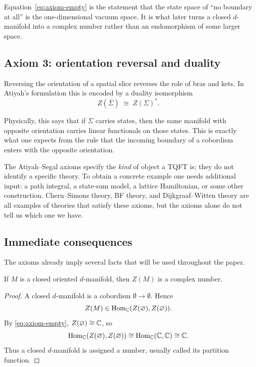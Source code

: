 \noindent Equation~\eqref{eq:axiom-empty} is the statement that the state space of ``no boundary at all'' is the one-dimensional vacuum space. It is what later turns a closed $d$-manifold into a complex number rather than an endomorphism of some larger space.

\subsection{Axiom 3: orientation reversal and duality}

Reversing the orientation of a spatial slice reverses the role of bras and kets. In Atiyah's formulation this is encoded by a duality isomorphism
\begin{equation}\label{eq:axiom-duality}
Z(\overline{\Sigma}) \;\cong\; Z(\Sigma)^*.
\end{equation}

\noindent Physically, this says that if $\Sigma$ carries states, then the same manifold with opposite orientation carries linear functionals on those states. This is exactly what one expects from the rule that the incoming boundary of a cobordism enters with the opposite orientation.

\begin{remark}\label{rem:axioms-not-enough}
The Atiyah--Segal axioms specify the \emph{kind} of object a TQFT is; they do not identify a specific theory. To obtain a concrete example one needs additional input: a path integral, a state-sum model, a lattice Hamiltonian, or some other construction. Chern--Simons theory, BF theory, and Dijkgraaf--Witten theory are all examples of theories that satisfy these axioms, but the axioms alone do not tell us which one we have.
\end{remark}

\subsection{Immediate consequences}

The axioms already imply several facts that will be used throughout the paper.

\begin{proposition}\label{prop:closed-manifolds-number}
If $M$ is a closed oriented $d$-manifold, then $Z(M)$ is a complex number.
\end{proposition}

\begin{proof}
A closed $d$-manifold is a cobordism $\emptyset \to \emptyset$. Hence
\begin{equation*}
Z(M) \in \operatorname{Hom}_{\mathbb{C}}(Z(\varnothing), Z(\varnothing)).
\end{equation*}
By \eqref{eq:axiom-empty}, $Z(\varnothing) \cong \mathbb{C}$, so
\begin{equation*}
\operatorname{Hom}_{\mathbb{C}}(Z(\varnothing), Z(\varnothing)) \cong \operatorname{Hom}_{\mathbb{C}}(\mathbb{C},\mathbb{C}) \cong \mathbb{C}.
\end{equation*}
Thus a closed $d$-manifold is assigned a number, usually called its partition function.
\end{proof}


